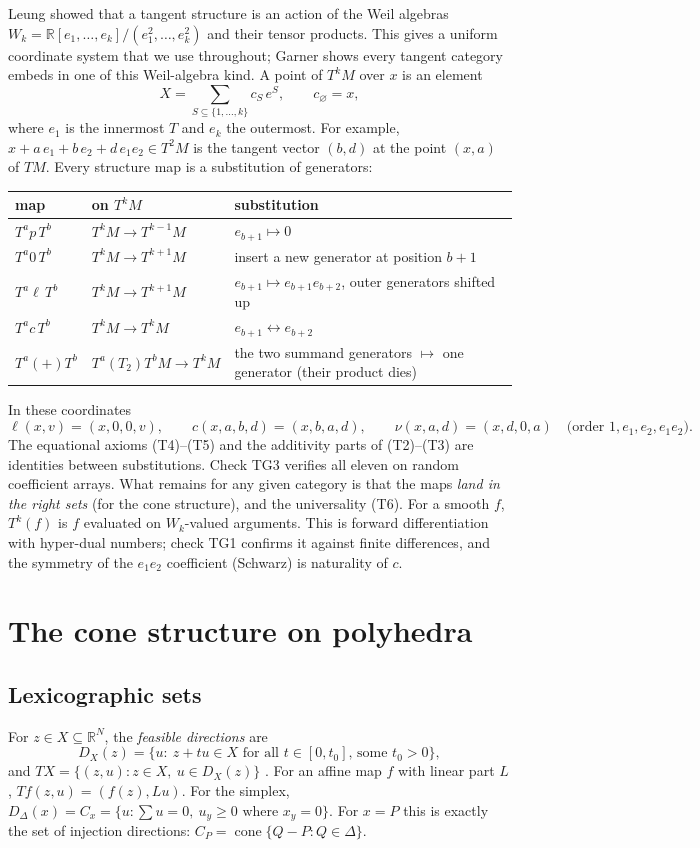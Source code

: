 \documentclass[11pt]{article}
\theoremstyle{definition}\newtheorem{definition}[theorem]{Definition}\newtheorem{remark}[theorem]{Remark}\newtheorem{example}[theorem]{Example}
\newcommand{\R}{\mathbb R}\newcommand{\X}{\mathbb X}\newcommand{\C}{\mathcal C}
\begin{document}
Leung \cite{Leung2017} showed that a tangent structure is an action of the Weil algebras
$W_k=\R[e_1,\dots,e_k]/(e_1^2,\dots,e_k^2)$ and their tensor products. This gives a uniform coordinate system that we use throughout; Garner \cite{Garner2018} shows every tangent category embeds in one of this Weil-algebra kind. A point
of $T^kM$ over $x$ is an element
\[
X=\sum_{S\subseteq\{1,\dots,k\}}c_S\,e^S,\qquad c_\varnothing=x,
\]
where $e_1$ is the innermost $T$ and $e_k$ the outermost. For example, $x+a\,e_1+b\,e_2+d\,e_1e_2\in T^2M$ is the tangent vector $(b,d)$ at
the point $(x,a)$ of $TM$. Every structure map is a substitution of generators:
\begin{center}\small
\begin{tabular}{lll}\toprule
map & on $T^kM$ & substitution\\\midrule
$T^ap\,T^b$ & $T^kM\to T^{k-1}M$ & $e_{b+1}\mapsto0$\\
$T^a0\,T^b$ & $T^kM\to T^{k+1}M$ & insert a new generator at position $b+1$\\
$T^a\ell\,T^b$ & $T^kM\to T^{k+1}M$ & $e_{b+1}\mapsto e_{b+1}e_{b+2}$, outer generators shifted up\\
$T^ac\,T^b$ & $T^kM\to T^kM$ & $e_{b+1}\leftrightarrow e_{b+2}$\\
$T^a({+})T^b$ & $T^a(T_2)T^bM\to T^kM$ & the two summand generators $\mapsto$ one generator (their product dies)\\\bottomrule
\end{tabular}
\end{center}
In these coordinates
\[
\ell(x,v)=(x,0,0,v),\qquad c(x,a,b,d)=(x,b,a,d),\qquad \nu(x,a,d)=(x,d,0,a)\quad\text{(order $1,e_1,e_2,e_1e_2$)}.
\]
The equational axioms (T4)--(T5) and the additivity parts of (T2)--(T3) are identities between substitutions. Check TG3 verifies all
eleven on random coefficient arrays. What remains for any given category is that the maps \emph{land in the right sets} (for
the cone structure), and the universality (T6). For a smooth $f$, $T^k(f)$ is $f$ evaluated on $W_k$-valued arguments. This is forward
differentiation with hyper-dual numbers; check TG1 confirms it against finite differences, and the symmetry of the $e_1e_2$ coefficient
(Schwarz) is naturality of $c$.

\section{The cone structure on polyhedra}\label{sec:cone}
\subsection{Lexicographic sets}
For $z\in X\subseteq\R^N$, the \emph{feasible directions} are
\[
D_X(z)=\{u:\ z+tu\in X\text{ for all }t\in[0,t_0]\text{, some }t_0>0\},
\]
and $TX=\{(z,u):z\in X,\ u\in D_X(z)\}$ \cite[Chapter 6]{RockafellarWets1998}. For an affine map $f$ with linear part $L$, $Tf(z,u)=(f(z),Lu)$. For the simplex,
$D_\Delta(x)=C_x=\{u:\sum u=0,\ u_y\ge0\text{ where }x_y=0\}$. For $x=P$ this is exactly the set of injection directions:
$C_P=\operatorname{cone}\{Q-P:Q\in\Delta\}$.
\end{document}
